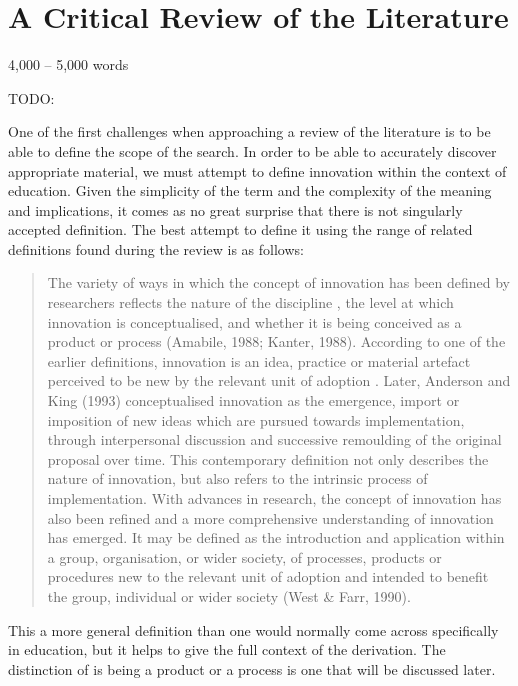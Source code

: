 \section{A Critical Review of the Literature}
4,000 – 5,000 words

TODO: \cite{Cordingley2007}

One of the first challenges when approaching a review of the literature is to be able to define the scope of the search. In order to be able to accurately discover appropriate material, we must attempt to define innovation within the context of education. Given the simplicity of the term and the complexity of the meaning and implications, it comes as no great surprise that there is not singularly accepted definition. The best attempt to define it using the range of related definitions found during the review is as follows:

\begin{quote}
The variety of ways in which the concept of innovation has been defined by researchers reflects the nature of the discipline \cite{Gopalakrishnan_1994}, the level at which innovation is conceptualised, and whether it is being conceived as a product or process (Amabile, 1988; Kanter, 1988). According to one of the earlier definitions, innovation is an idea, practice or material artefact perceived to be new by the relevant unit of adoption \cite{Allen_1975}. Later, Anderson and King (1993) conceptualised innovation as the emergence, import or imposition of new ideas which are pursued towards implementation, through interpersonal discussion and successive remoulding of the original proposal over time. This contemporary definition not only describes the nature of innovation, but also refers to the intrinsic process of implementation. With advances in research, the concept of innovation has also been refined and a more comprehensive understanding of innovation has emerged. It may be defined as the introduction and application within a group, organisation, or wider society, of processes, products or procedures new to the relevant unit of adoption and intended to benefit the group, individual or wider society (West & Farr, 1990).
\end{quote}  \cite{Sharma_2005}

This a more general definition than one would normally come across specifically in education, but it helps to give the full context of the derivation. The distinction of is being a product or a process \cite{} is one that will be discussed later.

